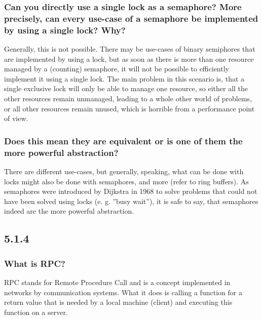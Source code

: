 \documentclass[12pt, a4paper]{article}
\begin{document}
\subsubsection*{Can you directly use a single lock as a semaphore? More precisely, can every use-case of 
a semaphore be implemented by using a single lock? Why?}
Generally, this is not possible. There may be use-cases of binary semiphores that are implemented by using a 
lock, but as soon as there is more than one resource managed by a (counting) semaphore, it will not be 
possible to efficiently implement it using a single lock. The main problem in this scenario is, that a single 
exclusive lock will only be able to manage one resource, so either all the other resources remain unmanaged, 
leading to a whole other world of problems, or all other resources remain unused, which is horrible from 
a performance point of view.

\subsubsection*{Does this mean they are equivalent or is one of them the more powerful abstraction?}
There are different use-cases, but generally, speaking, what can be done with locks might also be done with 
semaphores, and more (refer to ring buffers). As semaphores were introduced by Dijkstra in 1968 to solve problems 
that could not have been solved using locks (e. g. ''busy wait''), it is safe to say, that semaphores indeed 
are the more powerful abstraction.

\subsection*{5.1.4}
\subsubsection*{What is RPC?}
RPC stands for Remote Procedure Call and is a concept implemented in networks by communication systems. 
What it does is calling a function for a return value that is needed by a local machine (client) and executing 
this function on a server.
\end{document}
